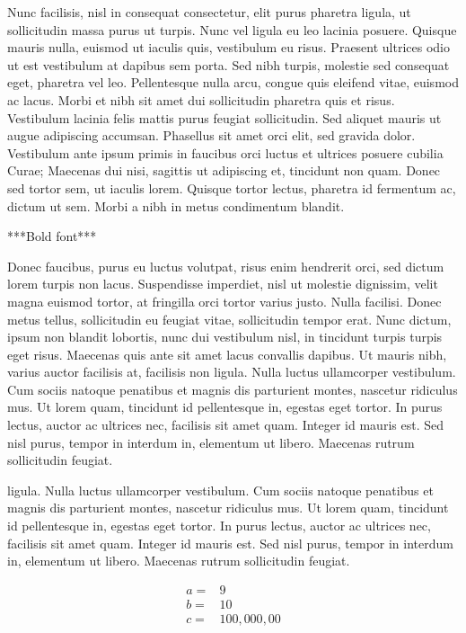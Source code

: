 Nunc facilisis, nisl in consequat consectetur, elit purus pharetra
ligula, ut sollicitudin massa purus ut turpis. Nunc vel ligula eu leo
lacinia posuere. Quisque mauris nulla, euismod ut iaculis quis,
vestibulum eu risus. Praesent ultrices odio ut est vestibulum at dapibus
sem porta. Sed nibh turpis, molestie sed consequat eget, pharetra vel
leo. Pellentesque nulla arcu, congue quis eleifend vitae, euismod ac
lacus. Morbi et nibh sit amet dui sollicitudin pharetra quis et risus.
Vestibulum lacinia felis mattis purus feugiat sollicitudin. Sed aliquet
mauris ut augue adipiscing accumsan. Phasellus sit amet orci elit, sed
gravida dolor. Vestibulum ante ipsum primis in faucibus orci luctus et
ultrices posuere cubilia Curae; Maecenas dui nisi, sagittis ut
adipiscing et, tincidunt non quam. Donec sed tortor sem, ut iaculis
lorem. Quisque tortor lectus, pharetra id fermentum ac, dictum ut sem.
Morbi a nibh in metus condimentum blandit.

\begin{aside}
***Bold font***

Donec faucibus, purus eu luctus volutpat, risus enim hendrerit orci, sed dictum
lorem turpis non lacus. Suspendisse imperdiet, nisl ut molestie dignissim,
velit magna euismod tortor, at fringilla orci tortor varius justo. Nulla
facilisi. Donec metus tellus, sollicitudin eu feugiat vitae, sollicitudin
tempor erat. Nunc dictum, ipsum non blandit lobortis, nunc dui vestibulum nisl,
in tincidunt turpis turpis eget risus. Maecenas quis ante sit amet lacus
convallis dapibus. Ut mauris nibh, varius auctor facilisis at, facilisis non
ligula. Nulla luctus ullamcorper vestibulum. Cum sociis natoque penatibus et
magnis dis parturient montes, nascetur ridiculus mus. Ut lorem quam, tincidunt
id pellentesque in, egestas eget tortor. In purus lectus, auctor ac ultrices
nec, facilisis sit amet quam. Integer id mauris est. Sed nisl purus, tempor in
interdum in, elementum ut libero. Maecenas rutrum sollicitudin feugiat.
\end{aside}

ligula. Nulla luctus ullamcorper vestibulum. Cum sociis natoque
penatibus et magnis dis parturient montes, nascetur ridiculus mus. Ut
lorem quam, tincidunt id pellentesque in, egestas eget tortor. In purus
lectus, auctor ac ultrices nec, facilisis sit amet quam. Integer id
mauris est. Sed nisl purus, tempor in interdum in, elementum ut libero.
Maecenas rutrum sollicitudin feugiat.

\begin{align*}
a =& 9 \\
b =& 10 \\
c =& 100,000,00
\end{align*}

